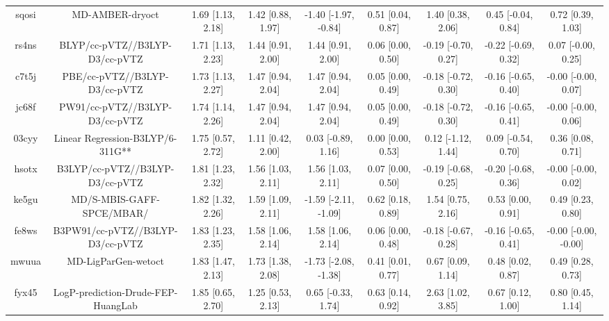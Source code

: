 \documentclass{article}
\begin{document}
\begin{center}
\begin{longtable}{|ccccccccc|}
 sqosi &                                    MD-AMBER-dryoct &  1.69 [1.13, 2.18] &  1.42 [0.88, 1.97] &  -1.40 [-1.97, -0.84] &  0.51 [0.04, 0.87] &    1.40 [0.38, 2.06] &   0.45 [-0.04, 0.84] &     0.72 [0.39, 1.03] \\
 rs4ns &                     BLYP/cc-pVTZ//B3LYP-D3/cc-pVTZ &  1.71 [1.13, 2.23] &  1.44 [0.91, 2.00] &     1.44 [0.91, 2.00] &  0.06 [0.00, 0.50] &  -0.19 [-0.70, 0.27] &  -0.22 [-0.69, 0.32] &    0.07 [-0.00, 0.25] \\
 c7t5j &                      PBE/cc-pVTZ//B3LYP-D3/cc-pVTZ &  1.73 [1.13, 2.27] &  1.47 [0.94, 2.04] &     1.47 [0.94, 2.04] &  0.05 [0.00, 0.49] &  -0.18 [-0.72, 0.30] &  -0.16 [-0.65, 0.40] &   -0.00 [-0.00, 0.07] \\
 jc68f &                     PW91/cc-pVTZ//B3LYP-D3/cc-pVTZ &  1.74 [1.14, 2.26] &  1.47 [0.94, 2.04] &     1.47 [0.94, 2.04] &  0.05 [0.00, 0.49] &  -0.18 [-0.72, 0.30] &  -0.16 [-0.65, 0.41] &   -0.00 [-0.00, 0.06] \\
 03cyy &                   Linear Regression-B3LYP/6-311G** &  1.75 [0.57, 2.72] &  1.11 [0.42, 2.00] &    0.03 [-0.89, 1.16] &  0.00 [0.00, 0.53] &   0.12 [-1.12, 1.44] &   0.09 [-0.54, 0.70] &     0.36 [0.08, 0.71] \\
 hsotx &                    B3LYP/cc-pVTZ//B3LYP-D3/cc-pVTZ &  1.81 [1.23, 2.32] &  1.56 [1.03, 2.11] &     1.56 [1.03, 2.11] &  0.07 [0.00, 0.50] &  -0.19 [-0.68, 0.25] &  -0.20 [-0.68, 0.36] &   -0.00 [-0.00, 0.02] \\
 ke5gu &                          MD/S-MBIS-GAFF-SPCE/MBAR/ &  1.82 [1.32, 2.26] &  1.59 [1.09, 2.11] &  -1.59 [-2.11, -1.09] &  0.62 [0.18, 0.89] &    1.54 [0.75, 2.16] &    0.53 [0.00, 0.91] &     0.49 [0.23, 0.80] \\
 fe8ws &                   B3PW91/cc-pVTZ//B3LYP-D3/cc-pVTZ &  1.83 [1.23, 2.35] &  1.58 [1.06, 2.14] &     1.58 [1.06, 2.14] &  0.06 [0.00, 0.48] &  -0.18 [-0.67, 0.28] &  -0.16 [-0.65, 0.41] &  -0.00 [-0.00, -0.00] \\
 mwuua &                                MD-LigParGen-wetoct &  1.83 [1.47, 2.13] &  1.73 [1.38, 2.08] &  -1.73 [-2.08, -1.38] &  0.41 [0.01, 0.77] &    0.67 [0.09, 1.14] &    0.48 [0.02, 0.87] &     0.49 [0.28, 0.73] \\
 fyx45 &                 LogP-prediction-Drude-FEP-HuangLab &  1.85 [0.65, 2.70] &  1.25 [0.53, 2.13] &    0.65 [-0.33, 1.74] &  0.63 [0.14, 0.92] &    2.63 [1.02, 3.85] &    0.67 [0.12, 1.00] &     0.80 [0.45, 1.14] \\

\end{longtable}
\end{center}
\end{document}
